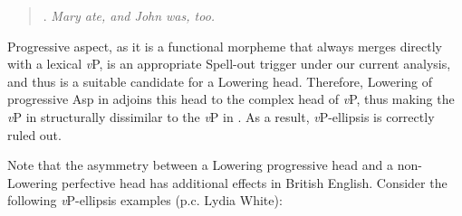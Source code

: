 \begin{minipage}{5.5in}
\begin{quote}
\ex. {\it *Mary ate, and John was, too.}

\qtreecentertrue
\end{quote}
\end{minipage}
Progressive aspect, as it is a functional morpheme that always merges directly with a lexical {\it v}P, is an appropriate Spell-out trigger under our current analysis, and thus is a suitable candidate for a Lowering head. Therefore, Lowering of progressive Asp in \Last[b] adjoins this head to the complex head of {\it v}P, thus making the {\it v}P in \Last[b] structurally dissimilar to the {\it v}P in \Last[a]. As a result, {\it v}P-ellipsis is correctly ruled out.

Note that the asymmetry between a Lowering progressive head and a non-Lowering perfective head has additional effects in British English. Consider the following {\it v}P-ellipsis examples (p.c. Lydia White):

